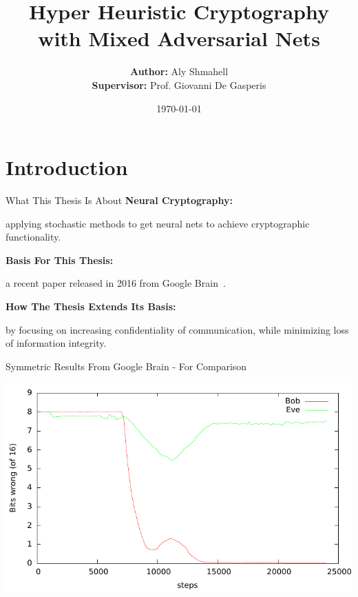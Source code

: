 \documentclass{beamer}
\title{Hyper Heuristic Cryptography with Mixed Adversarial Nets}
\date{\today}
\author{\textbf{Author:} Aly Shmahell \\ \textbf{Supervisor:} Prof. Giovanni De Gasperis}
\institute{University of L'Aquila}
\begin{document}
	\maketitle
	\section{Introduction}
		\begin{frame}{What This Thesis Is About}
			\vfill
			\textbf{Neural Cryptography:} \\
			{\centering
				applying stochastic methods to get neural nets to achieve cryptographic functionality.
				\par}
			\vfill
			\textbf{Basis For This Thesis:}\\
			{\centering
				a recent paper released in 2016 from Google Brain~\citep{DBLP:journals/corr/AbadiA16}.
				\par}
			\vfill
			\textbf{How The Thesis Extends Its Basis:}\\
			{\centering
				by focusing on increasing confidentiality of communication, while minimizing loss of information integrity.
			\par}
		\end{frame}
		\begin{frame}{Symmetric Results From Google Brain - For Comparison}
			\begin{center}
				\includegraphics[height=0.8\textheight]{cryptolearn_batch_tighter}
			\end{center}
		\end{frame}
\end{document}
